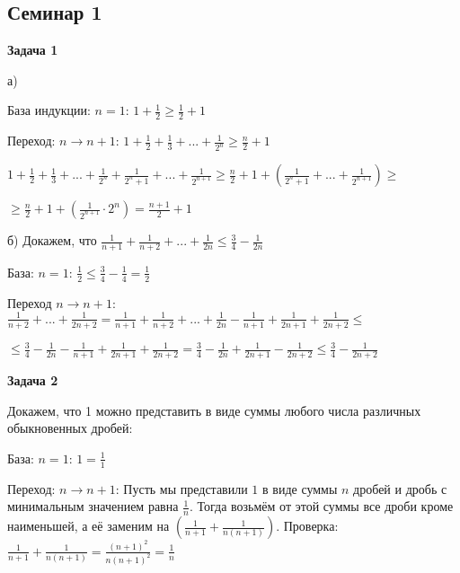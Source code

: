 \subsection{Семинар 1}
\begin{center}
\textbf{Задача 1}
\end{center}
а) 

База индукции: $\displaystyle n=1$: $\displaystyle 1+\frac{1}{2} \geqslant \frac{1}{2} +1$

Переход: $\displaystyle n\rightarrow n+1$: $\displaystyle 1+\frac{1}{2} +\frac{1}{3} +...+\frac{1}{2^{n}} \geqslant \frac{n}{2} +1$

$\displaystyle 1+\frac{1}{2} +\frac{1}{3} +...+\frac{1}{2^{n}} +\frac{1}{2^{n} +1} +...+\frac{1}{2^{n+1}} \geqslant \frac{n}{2} +1+\left(\frac{1}{2^{n} +1} +...+\frac{1}{2^{n+1}}\right) \geqslant $

$\displaystyle \geqslant \frac{n}{2} +1+\left(\frac{1}{2^{n+1}} \cdotp 2^{n}\right) =\frac{n+1}{2} +1$

б) Докажем, что $\displaystyle \frac{1}{n+1} +\frac{1}{n+2} +...+\frac{1}{2n} \leqslant \frac{3}{4} -\frac{1}{2n}$

База: $\displaystyle n=1$: $\displaystyle \frac{1}{2} \leqslant \frac{3}{4} -\frac{1}{4} =\frac{1}{2}$

Переход $\displaystyle n\rightarrow n+1$: $\displaystyle \frac{1}{n+2} +...+\frac{1}{2n+2} =\frac{1}{n+1} +\frac{1}{n+2} +...+\frac{1}{2n} -\frac{1}{n+1} +\frac{1}{2n+1} +\frac{1}{2n+2} \leqslant $

$\displaystyle \leqslant \frac{3}{4} -\frac{1}{2n} -\frac{1}{n+1} +\frac{1}{2n+1} +\frac{1}{2n+2} =\frac{3}{4} -\frac{1}{2n} +\frac{1}{2n+1} -\frac{1}{2n+2} \leqslant \frac{3}{4} -\frac{1}{2n+2}$

\begin{center}
\textbf{Задача 2}
\end{center}
Докажем, что 1 можно представить в виде суммы любого числа различных обыкновенных дробей:

База: $\displaystyle n=1$: $\displaystyle 1=\frac{1}{1}$

Переход: $\displaystyle n\rightarrow n+1$: Пусть мы представили $\displaystyle 1$ в виде суммы $\displaystyle n$ дробей и дробь с минимальным значением равна $\displaystyle \frac{1}{n}$. Тогда возьмём от этой суммы все дроби кроме наименьшей, а её заменим на $\displaystyle \left(\frac{1}{n+1} +\frac{1}{n( n+1)}\right)$. Проверка: $\displaystyle \frac{1}{n+1} +\frac{1}{n( n+1)} =\frac{( n+1)^{2}}{n( n+1)^{2}} =\frac{1}{n}$

